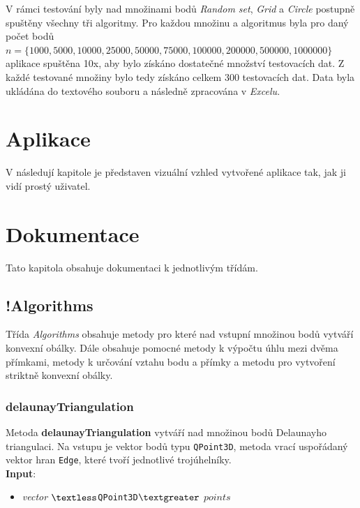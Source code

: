 \documentclass[a4paper, 12pt]{article}
\begin{document}
V rámci testování byly nad množinami bodů \textit{Random set}, \textit{Grid} a \textit{Circle} postupně spuštěny všechny tři algoritmy. Pro každou množinu a algoritmus byla pro daný počet bodů $n = \{1000, 5000, 10000, 25000, 50000, 75000, 100000, 200000, 500000, 1000000\}$ aplikace spuš\-tě\-na 10x, aby bylo získáno dostatečné množství testovacích dat. Z každé testované množiny bylo tedy získáno celkem 300 testovacích dat. Data byla ukládána do textového souboru a následně zpracována v \textit{Excelu}.


\clearpage
\section{Aplikace}
V následují kapitole je představen vizuální vzhled vytvořené aplikace tak, jak ji vidí prostý uživatel.




\clearpage
 
\section{Dokumentace}
Tato kapitola obsahuje dokumentaci k jednotlivým třídám.

\subsection{!Algorithms}
Třída \textit{Algorithms} obsahuje metody pro  které nad vstupní množinou bodů vytváří konvexní obálky. Dále obsahuje pomocné metody k výpočtu úhlu mezi dvěma přímkami, metody k určování vztahu bodu a přímky a metodu pro vytvoření striktně konvexní obálky.

\subsubsection*{delaunayTriangulation}
Metoda \textbf{delaunayTriangulation} vytváří nad množinou bodů Delaunayho triangulaci. Na vstupu je vektor bodů typu \texttt{QPoint3D}, metoda vrací uspořádaný vektor hran \texttt{Edge}, které tvoří jednotlivé trojúhelníky.\\

\textbf{Input}:
\begin{itemize}
\item \textsl{vector} $\textless$\texttt{QPoint3D}$\textgreater$ $points$
\end{itemize}
\end{document}
